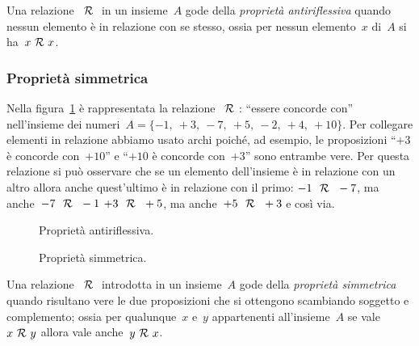 \begin{definizione}
Una relazione~\(~\mathcal{R}~\) in un insieme~\(A\) gode della \emph{proprietà 
antiriflessiva} quando nessun elemento è in relazione con se stesso,
ossia per nessun elemento~\(x\) di~\(A\) si ha~\(x ~\mathcal{R}~ x\).
\end{definizione}

\subsubsection{Proprietà simmetrica}

 \begin{esempio}
Nella figura~\ref{fig:B.4} è rappresentata la relazione~\(~\mathcal{R}~\): ``essere 
concorde con'' nell'insieme dei 
numeri~\(A = \lbrace -1,~+3,~-7,~+5,~-2,~+4,~+10 \rbrace\).
Per collegare elementi in relazione abbiamo usato archi poiché, ad esempio, 
le 
proposizioni ``\(+3\) è concorde con~\(+10\)'' e ``\(+10\) è concorde 
con~\(+3\)''
sono entrambe vere. Per questa relazione si può osservare che se un elemento 
dell'insieme è in relazione con un altro allora anche quest'ultimo
è in relazione con il primo:
\(-1~~\mathcal{R}~~-7\), ma anche~\(-7~~\mathcal{R}~~-1\) \(+3~~\mathcal{R}~~+5\), ma 
anche~\(+5~~\mathcal{R}~~+3\) e così 
via.
 \end{esempio}

\begin{inaccessibleblock}
 \begin{figure}[t]
\begin{minipage}[t]{.45\textwidth}
 \centering
 
 \caption{Proprietà antiriflessiva.}\label{fig:B.3}
\end{minipage}\hfil
\begin{minipage}[t]{.45\textwidth}
 \centering
 
 \caption{Proprietà simmetrica.}\label{fig:B.4}
\end{minipage}
\end{figure}
\end{inaccessibleblock}

\begin{definizione}
Una relazione~\(~\mathcal{R}~\) introdotta in un insieme~\(A\) gode della 
\emph{proprietà 
simmetrica} quando risultano vere le due proposizioni
che si ottengono scambiando soggetto e complemento; ossia per qualunque~\(x\) 
e~\(y\) appartenenti all'insieme~\(A\) se vale~\(x ~\mathcal{R}~ y\)
allora vale anche~\(y ~\mathcal{R}~ x\).
\end{definizione}


